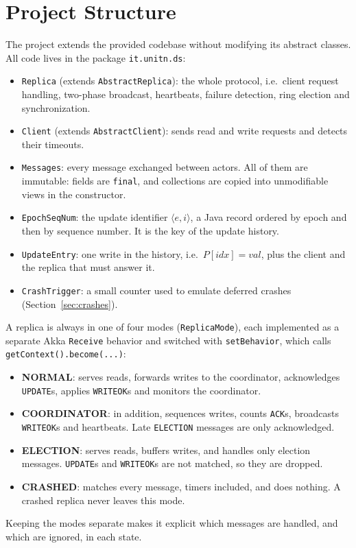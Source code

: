 \section{Project Structure}

The project extends the provided codebase without modifying its abstract classes. All code lives in the package \texttt{it.unitn.ds}:

\begin{itemize}[nosep]
    \item \texttt{Replica} (extends \texttt{AbstractReplica}): the whole protocol, i.e.\ client request handling, two-phase broadcast, heartbeats, failure detection, ring election and synchronization.
    \item \texttt{Client} (extends \texttt{AbstractClient}): sends read and write requests and detects their timeouts.
    \item \texttt{Messages}: every message exchanged between actors. All of them are immutable: fields are \texttt{final}, and collections are copied into unmodifiable views in the constructor.
    \item \texttt{EpochSeqNum}: the update identifier $\langle e, i\rangle$, a Java record ordered by epoch and then by sequence number. It is the key of the update history.
    \item \texttt{UpdateEntry}: one write in the history, i.e.\ $P[\mathit{idx}] = \mathit{val}$, plus the client and the replica that must answer it.
    \item \texttt{CrashTrigger}: a small counter used to emulate deferred crashes (Section~\ref{sec:crashes}).
\end{itemize}

A replica is always in one of four modes (\texttt{ReplicaMode}), each implemented as a separate Akka \texttt{Receive} behavior and switched with \texttt{setBehavior}, which calls \texttt{getContext().become(...)}:

\begin{itemize}[nosep]
    \item \textbf{NORMAL}: serves reads, forwards writes to the coordinator, acknowledges \texttt{UPDATE}s, applies \texttt{WRITEOK}s and monitors the coordinator.
    \item \textbf{COORDINATOR}: in addition, sequences writes, counts \texttt{ACK}s, broadcasts \texttt{WRITEOK}s and heartbeats. Late \texttt{ELECTION} messages are only acknowledged.
    \item \textbf{ELECTION}: serves reads, buffers writes, and handles only election messages. \texttt{UPDATE}s and \texttt{WRITEOK}s are not matched, so they are dropped.
    \item \textbf{CRASHED}: matches every message, timers included, and does nothing. A crashed replica never leaves this mode.
\end{itemize}

Keeping the modes separate makes it explicit which messages are handled, and which are ignored, in each state.
